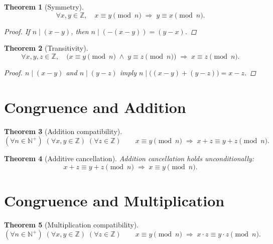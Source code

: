 \documentclass[11pt]{article}
\theoremstyle{defstyle}
\theoremstyle{thmstyle}
\newtheorem{theorem}{Theorem}[section]
\theoremstyle{notstyle}
\theoremstyle{cautionstyle}
\newcommand{\Z}{\mathbb{Z}}
\newcommand{\N}{\mathbb{N}}
\begin{document}
\begin{thmbox}
\begin{theorem}[Symmetry]
\[
  \forall x, y \in \Z,\quad x \equiv y \pmod{n} \;\Rightarrow\; y \equiv x \pmod{n}.
\]
\begin{proof}
If $n \mid (x-y)$, then $n \mid (-(x-y)) = (y-x)$.
\end{proof}
\end{theorem}
\end{thmbox}

\begin{thmbox}
\begin{theorem}[Transitivity]
\[
  \forall x,y,z \in \Z,\quad \bigl(x \equiv y \pmod{n} \;\wedge\; y \equiv z \pmod{n}\bigr)
  \;\Rightarrow\; x \equiv z \pmod{n}.
\]
\begin{proof}
$n \mid (x-y)$ and $n \mid (y-z)$ imply $n \mid \bigl((x-y)+(y-z)\bigr) = x-z$.
\end{proof}
\end{theorem}
\end{thmbox}

\section{Congruence and Addition}

\begin{thmbox}
\begin{theorem}[Addition compatibility]
\[
  (\forall n \in \N^+)\;(\forall x,y \in \Z)\;(\forall z \in \Z)\qquad
  x \equiv y \pmod{n} \;\Rightarrow\; x+z \equiv y+z \pmod{n}.
\]
\end{theorem}
\end{thmbox}

\begin{thmbox}
\begin{theorem}[Additive cancellation]
Addition cancellation holds unconditionally:
\[
  x + z \equiv y + z \pmod{n} \;\Rightarrow\; x \equiv y \pmod{n}.
\]
\end{theorem}
\end{thmbox}

\section{Congruence and Multiplication}

\begin{thmbox}
\begin{theorem}[Multiplication compatibility]
\[
  (\forall n \in \N^+)\;(\forall x,y \in \Z)\;(\forall z \in \Z)\qquad
  x \equiv y \pmod{n} \;\Rightarrow\; x \cdot z \equiv y \cdot z \pmod{n}.
\]
\end{theorem}
\end{thmbox}
\end{document}
